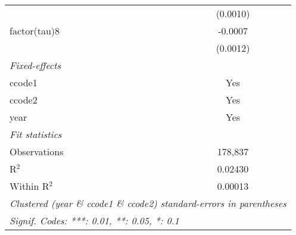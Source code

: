 \begin{tabular}{lc}
                       & (0.0010)\\   
   factor(tau)8        & -0.0007\\   
                       & (0.0012)\\   
   \midrule
   \emph{Fixed-effects}\\
   ccode1              & Yes\\  
   ccode2              & Yes\\  
   year                & Yes\\  
   \midrule
   \emph{Fit statistics}\\
   Observations        & 178,837\\  
   R$^2$               & 0.02430\\  
   Within R$^2$        & 0.00013\\  
   \midrule \midrule
   \multicolumn{2}{l}{\emph{Clustered (year \& ccode1 \& ccode2) standard-errors in parentheses}}\\
   \multicolumn{2}{l}{\emph{Signif. Codes: ***: 0.01, **: 0.05, *: 0.1}}\\
\end{tabular}
\par\endgroup



